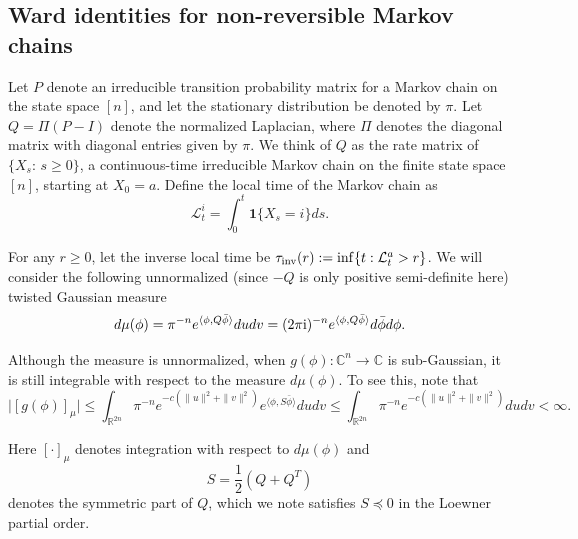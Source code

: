 \documentclass[a4paper, 11pt]{article}
\newcommand{\ind}{\mathbf{1}}
\newcommand{\Ell}{\mathcal{L}}
\newcommand{\inv}{\tau_\textnormal{inv}}
\newcommand{\compi}{\textnormal{i}}
\newcommand{\orth}{{\mathbb{R}^{2n}}}
\begin{document}
\subsection{Ward identities for non-reversible Markov chains}

Let $P$ denote an irreducible transition probability matrix for a Markov chain on the state space $[n]$, and let the stationary distribution be denoted by $\pi$. Let $Q=\Pi(P-I)$ denote the normalized Laplacian, where $\Pi$ denotes the diagonal matrix with diagonal entries given by $\pi$. We think of $Q$ as the rate matrix of $\{X_s:\, s\geq 0\}$, a continuous-time irreducible Markov chain on the finite state space $[n]$, starting at $X_0=a$. Define the local time of the Markov chain as
\begin{equation}
\Ell_t^i=\int_0^t \ind\{X_s=i\}ds.
\label{eqn:localtime}
\end{equation}

For any $r\geq 0$, let the inverse local time be $\inv(r):=\inf\{t : \Ell_t^a>r\}$. We will consider the following unnormalized (since $-Q$ is only positive semi-definite here) twisted Gaussian measure
\[d\mu(\phi)= \pi^{-n} e^{\langle \phi, Q\bar{\phi}\rangle}dudv=(2\pi\compi)^{-n}e^{\langle \phi, Q\bar{\phi}\rangle}d\bar{\phi} d\phi .\]

Although the measure is unnormalized, when $g(\phi):\mathbb{C}^n\rightarrow \mathbb{C}$ is sub-Gaussian, it is still integrable with respect to the measure $d\mu(\phi)$. To see this, note that
\[\big|[ g(\phi)]_\mu\big|
\leq \int_{\orth} \pi^{-n} e^{-c(\|u\|^2+\|v\|^2)}e^{\langle \phi, S\bar{\phi}\rangle}dudv
\leq \int_\orth \pi^{-n} e^{-c(\|u\|^2+\|v\|^2)}dudv<\infty.\]

Here $[\cdot]_\mu$ denotes integration with respect to $d\mu(\phi)$
and
\begin{equation}    \label{eq:defineS}
S=\frac{1}{2}(Q+Q^T)
\end{equation}
denotes the symmetric part of $Q$, which we note satisfies $S\preceq 0$ in the Loewner partial order.
\end{document}
